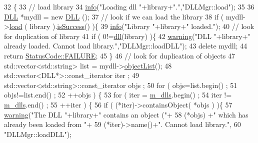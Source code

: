 \begin{DoxyCode}
32                                             \{
33   \textcolor{comment}{// load library}
34   \hyperlink{classDLLMgr_a14b8e15b87602027c0a11f91173bebed}{info}(\textcolor{stringliteral}{"Loading dll "}+library+\textcolor{stringliteral}{"."},\textcolor{stringliteral}{"DLLMgr::load"});
35 
36   \hyperlink{classDLL}{DLL} *mydll = \textcolor{keyword}{new} \hyperlink{classDLL}{DLL} ();
37   \textcolor{comment}{// look if we can load the library}
38   \textcolor{keywordflow}{if} ( mydll->\hyperlink{classDLL_a64166d3479edf7e44fd539841e70fb3a}{load} ( library ).\hyperlink{classStatusCode_acfe5ce8b2bb7d3d651fb0108c18c05c3}{isSuccess}() )\{
39     \hyperlink{classDLLMgr_a14b8e15b87602027c0a11f91173bebed}{info}(\textcolor{stringliteral}{"Library "}+library+\textcolor{stringliteral}{" loaded."});
40     \textcolor{comment}{// look for duplication of library}
41     \textcolor{keywordflow}{if} ( 0!=\hyperlink{classDLLMgr_a0241372eb2e136f61e609a04426636bd}{dll}(library) )\{
42       \hyperlink{classDLLMgr_ad8a177de233cda457b5566e4ff3bb50e}{warning}(\textcolor{stringliteral}{"DLL "}+library+\textcolor{stringliteral}{" already loaded. Cannot load library."},\textcolor{stringliteral}{"DLLMgr::loadDLL"});
43       \textcolor{keyword}{delete} mydll;
44       \textcolor{keywordflow}{return} \hyperlink{classStatusCode_a6f565cbeadc76d14c72f047e5e85eb4ba3da73d4c469762eb9d3c960368252b26}{StatusCode::FAILURE};
45     \}
46     \textcolor{comment}{// look for duplication of objects}
47     std::vector<std::string> list = mydll->\hyperlink{classDLL_a7d378e5aceb5b06e0fd7df6bc07f9ee5}{objectList}();
48     std::vector<DLL*>::const\_iterator iter ;
49     std::vector<std::string>::const\_iterator objs ;
50     \textcolor{keywordflow}{for} ( objs=list.begin() ; 
51           objs!=list.end()  ;
52           ++objs ) \{
53       \textcolor{keywordflow}{for} ( iter = \hyperlink{classDLLMgr_a5bd713edea21d64f32aa71162bca581a}{m\_dlls}.begin() ; 
54             iter != \hyperlink{classDLLMgr_a5bd713edea21d64f32aa71162bca581a}{m\_dlls}.end() ; 
55             ++iter ) \{
56         \textcolor{keywordflow}{if} ( (*iter)->containsObject( *objs ) )\{
57           \hyperlink{classDLLMgr_ad8a177de233cda457b5566e4ff3bb50e}{warning}(\textcolor{stringliteral}{"The DLL "}+library+\textcolor{stringliteral}{" contains an object ("}+
58                  (*objs) +\textcolor{stringliteral}{" which has already been loaded from "}+
59                  (*iter)->name()+\textcolor{stringliteral}{". Cannot load library."},
60           \textcolor{stringliteral}{"DLLMgr::loadDLL"});

\end{DoxyCode}
